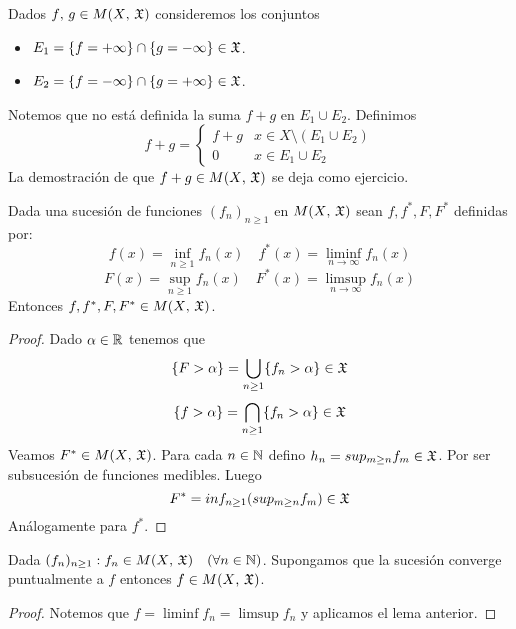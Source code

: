 \begin{note}
    Dados $f\text{, } g \in M(X\text{, } \mathfrak{X})$ consideremos los conjuntos \begin{itemize}
        \item $E_1 = \{ f = + \infty \} \cap \{ g = - \infty \} \in \mathfrak{X}$.
        \item $E_2 = \{ f = - \infty \} \cap \{ g = + \infty \} \in \mathfrak{X}$.
    \end{itemize}
    Notemos que no está definida la suma $f + g$ en $E_1 \cup E_2$.
    Definimos \begin{equation*}
        f+g = \begin{cases}
            f+g & x \in X \setminus (E_1 \cup E_2) \\
            0   & x \in E_1 \cup E_2
        \end{cases}
    \end{equation*}
    La demostración de que $f+g \in M(X\text{, } \mathfrak{X})$ se deja como ejercicio.
\end{note}

\begin{lemma}
    Dada una sucesión de funciones $(f_n)_{n \geq 1}$ en $M(X\text{, } \mathfrak{X})$ sean $f, f^*, F, F^*$ definidas por:
    \begin{equation*}
        f(x) = \inf_{n \geq 1} f_n(x) \quad f^*(x) = \liminf_{n \to \infty} f_n(x)
    \end{equation*}
    \begin{equation*}
        F(x) = \sup_{n \geq 1} f_n(x) \quad F^*(x) = \limsup_{n \to \infty} f_n(x)
    \end{equation*}
    Entonces $f, f^*, F, F^* \in M(X\text{, } \mathfrak{X})$.
    \begin{proof}
        Dado $\alpha \in \mathbb{R}$ tenemos que \begin{equation*}
            \{ F > \alpha \} = \bigcup_{n \geq 1} \{ f_n > \alpha \} \in \mathfrak{X}
        \end{equation*}
        \begin{equation*}
            \{ f > \alpha \} = \bigcap_{n \geq 1} \{ f_n > \alpha \} \in \mathfrak{X}
        \end{equation*}
        Veamos $F^* \in M(X\text{, } \mathfrak{X})$. Para cada $n \in \mathbb{N}$ defino $h_n = sup_{m \geq n} f_m \in \mathfrak{X}$. Por ser subsucesión de funciones medibles.
        Luego \begin{equation*}
            F^* = inf_{n \geq 1} (sup_{m \geq n} f_m) \in \mathfrak{X}
        \end{equation*}
        Análogamente para $f^*$.
    \end{proof}
\end{lemma}

\begin{corollary}
    Dada $(f_n)_{n \geq 1} : f_n \in M(X\text{, } \mathfrak{X}) \quad (\forall n \in \mathbb{N})$. Supongamos que la sucesión converge puntualmente a $f$ entonces $f \in M(X\text{, } \mathfrak{X})$.
    \begin{proof}
        Notemos que $f = \liminf f_n = \limsup f_n$ y aplicamos el lema anterior.
    \end{proof}
\end{corollary}
